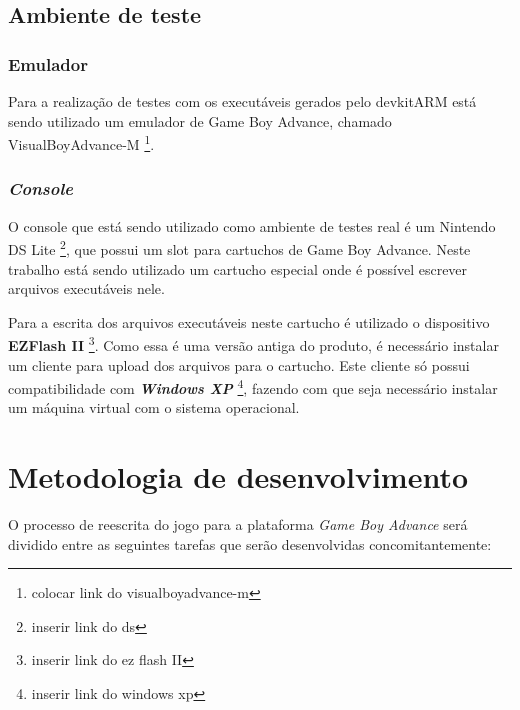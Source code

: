   \subsection{Ambiente de teste}

    \subsubsection{Emulador}

      Para a realização de testes com os executáveis gerados pelo devkitARM está sendo utilizado um emulador de Game Boy Advance, chamado VisualBoyAdvance-M \footnote{colocar link do visualboyadvance-m}.

    \subsubsection{\textit{Console}}


      O console que está sendo utilizado como ambiente de testes real é um Nintendo DS Lite \footnote{inserir link do ds}, que possui um slot para cartuchos de Game Boy Advance. Neste trabalho está sendo utilizado um cartucho especial onde é possível escrever arquivos executáveis nele.

      Para a escrita dos arquivos executáveis neste cartucho é utilizado o dispositivo \textbf{EZFlash II} \footnote{inserir link do ez flash II}. Como essa é uma versão antiga do produto, é necessário instalar um cliente para upload dos arquivos para o cartucho. Este cliente só possui compatibilidade com \textit{\textbf{Windows XP}} \footnote{inserir link do windows xp}, fazendo com que seja necessário instalar um máquina virtual com o sistema operacional.

\section{Metodologia de desenvolvimento}

  O processo de reescrita do jogo para a plataforma \textit{Game Boy Advance} será dividido entre as seguintes tarefas que serão desenvolvidas concomitantemente:

